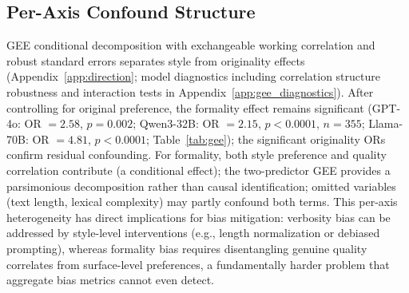\subsection{Per-Axis Confound Structure}
\label{sec:direction}

GEE conditional decomposition \citep{liang1986gee} with exchangeable working correlation and robust standard errors separates style from originality effects (Appendix~\ref{app:direction}; model diagnostics including correlation structure robustness and interaction tests in Appendix~\ref{app:gee_diagnostics}).
After controlling for original preference, the formality effect remains significant (GPT-4o: OR $= 2.58$, $p = 0.002$; Qwen3-32B: OR $= 2.15$, $p < 0.0001$, $n = 355$; Llama-70B: OR $= 4.81$, $p < 0.0001$; Table~\ref{tab:gee}); the significant originality ORs confirm residual confounding.
For formality, both style preference and quality correlation contribute (a conditional effect); the two-predictor GEE provides a parsimonious decomposition rather than causal identification; omitted variables (text length, lexical complexity) may partly confound both terms.
This per-axis heterogeneity has direct implications for bias mitigation: verbosity bias can be addressed by style-level interventions (e.g., length normalization or debiased prompting), whereas formality bias requires disentangling genuine quality correlates from surface-level preferences, a fundamentally harder problem that aggregate bias metrics cannot even detect.

